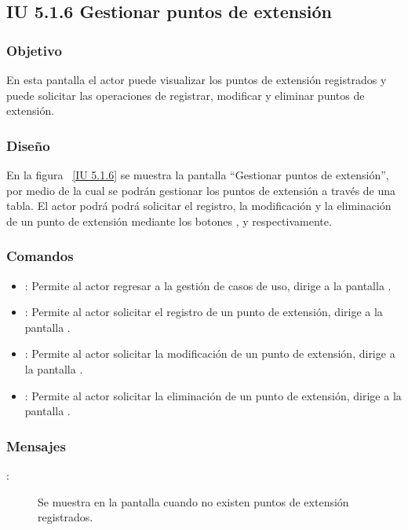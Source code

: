 \newpage 
\subsection{IU 5.1.6 Gestionar puntos de extensión}
\subsubsection{Objetivo}
	
	En esta pantalla el actor puede visualizar los puntos de extensión registrados y puede solicitar las operaciones de registrar, modificar y eliminar puntos de extensión.

\subsubsection{Diseño}

    En la figura ~\ref{IU 5.1.6} se muestra la pantalla ``Gestionar puntos de extensión'', por medio de la cual 
    se podrán gestionar los puntos de extensión a través de una tabla.
    El actor podrá podrá solicitar el registro, la modificación y la eliminación de un punto de extensión mediante los botones
    , \btnEditar y \btnEliminar respectivamente. \\
    



\subsubsection{Comandos}
\begin{itemize}
	\item {}: Permite al actor regresar a la gestión de casos de uso, dirige a la pantalla .
	\item {}: Permite al actor solicitar el registro de un punto de extensión, dirige a la pantalla .
	\item \btnEditar[Modificar]: Permite al actor solicitar la modificación de un punto de extensión, dirige a la pantalla .
	\item \btnEliminar[Eliminar]: Permite al actor solicitar la eliminación de un punto de extensión, dirige a la pantalla .
\end{itemize}

\subsubsection{Mensajes}

	
\begin{description}
	\item[:] Se muestra en la pantalla  cuando no existen puntos de extensión registrados.
\end{description}
